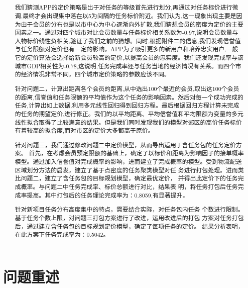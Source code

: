 \documentclass{cumcmthesis}
\title{ }
\begin{document}
 \maketitle
 \begin{abstract}
我们猜测APP的定价策略是出于对任务的等级首先进行划分,再通过对任务标价进行微调,最终才会出现集中落在以5为间隔的任务标价附近。我们认为,这一现象出现主要是因为由于会员的分布也是以市中心为中心逐渐向外扩散,我们猜想会员的密度为定价的主要因素之一。通过对四个城市对比会员数量与任务标价相关系数为-0.97,说明会员数量与人物标价线性负相关,验证了我们之前的猜想。同时,根据附件二的信息,我们发现信誉值与任务限额对定价也有一定的影响，APP为了吸引更多的新用户和培养忠实用户,一般它的定价算法会选择给新会员较高的定价,以提高会员的忠实度。我们还发现完成率与该城市GDP相关性为-0.78,这说明,任务完成率还与任务当地的经济情况有关系。而四个市的经济情况非常不同，四个城市定价策略的参数应该不同。

针对问题二，计算出距离各个会员的距离,从中选出100个最近的会员,取出这100个会员的距离,信誉值和任务限额的平均值作为这个任务的影响因素。然后对每一个成功完成的任务,计算出如上数据,利用多元线性回归得到回归方程。最后根据回归方程计算未完成的任务的期望定价,进行修正。我们的以平均距离、平均信誉值和平均限额为变量的多元线性拟合取得了比较满意的结果。但是我们同时发现我们的模型对郊区的高价任务标价有着较高的拟合度,而对市区的定价大多都高于原价。

针对问题三，我们通过修改问题二中定价模型，从而导出适用于含任务包的任务定价方案。 首先，在考虑会员预定限额的基础上，确定了以标价和距离为影响因子的接单概率模型。通过加入信誉值对完成概率的影响，进而建立了完成概率的模型。受到物流配送区域划分方法的启发，建立了基于点密度的任务聚类模型对任 务进行打包处理。进而类比问题二，建立了含任务包的目标规划模型，确定最优定价， 并得出此定价下的任务完成概率。与问题二中任务完成率、标价总额进行对比，结果表 明，将任务打包后任务完成率提高。其中打包后的任务理论完成率为：0.8059,有显著提升。

针对新项目任务分布高度集中的特点，需要结合实际，对任务包内任务 个数进行限制。基于任务个数上限，对问题三打包方案进行了改进，运用改进后的打包 方案对任务打包后，通过建立含任务包的目标规划定价模型，确定了每项任务的定价。 结果分析表明，在此方案下任务完成率为：0.5042。



\end{abstract}




\tableofcontents
\newpage
\section{问题重述}
\end{document}
